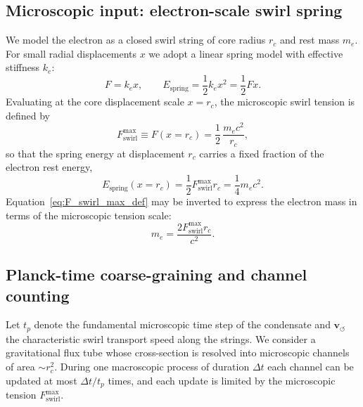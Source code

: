 \documentclass[10pt,reprint,aps,onecolumn,nofootinbib]{revtex4-2}
\newcommand{\vswirl}{\mathbf{v}_{\!\boldsymbol{\circlearrowleft}}}
\newcommand{\rc}{r_c}                                    %
\begin{document}
        \subsection{Microscopic input: electron-scale swirl spring}

            We model the electron as a closed swirl string of core radius \(\rc\) and
            rest mass \(m_e\). For small radial displacements \(x\) we adopt a linear
            spring model with effective stiffness \(k_e\):
            \begin{equation}
                F = k_e x,
                \qquad
                E_{\text{spring}} = \frac{1}{2}k_e x^2
                = \frac{1}{2}F x.
            \end{equation}
            Evaluating at the core displacement scale \(x=\rc\), the microscopic swirl
            tension is defined by
            \begin{equation}
                F_{\text{swirl}}^{\max}
                \equiv F(x=\rc)
                = \frac{1}{2}\,\frac{m_e c^2}{\rc},
                \label{eq:F_swirl_max_def}
            \end{equation}
            so that the spring energy at displacement \(\rc\) carries a fixed fraction of
            the electron rest energy,
            \begin{equation}
                E_{\text{spring}}(x=\rc)
                = \frac{1}{2} F_{\text{swirl}}^{\max} \rc
                = \frac{1}{4} m_e c^2.
            \end{equation}
            Equation~\eqref{eq:F_swirl_max_def} may be inverted to express the electron mass
            in terms of the microscopic tension scale:
            \begin{equation}
                m_e = \frac{2 F_{\text{swirl}}^{\max} \rc}{c^2}.
                \label{eq:me_from_Fswirl}
            \end{equation}

        \subsection{Planck-time coarse-graining and channel counting}

            Let \(t_p\) denote the fundamental microscopic time step of the condensate and
            \(\vswirl\) the characteristic swirl transport speed along the strings.
            We consider a gravitational flux tube whose cross-section is resolved into
            microscopic channels of area \(\sim \rc^2\). During one macroscopic process of
            duration \(\Delta t\) each channel can be updated at most \(\Delta t/t_p\)
            times, and each update is limited by the microscopic tension
            \(F_{\text{swirl}}^{\max}\).
\end{document}
